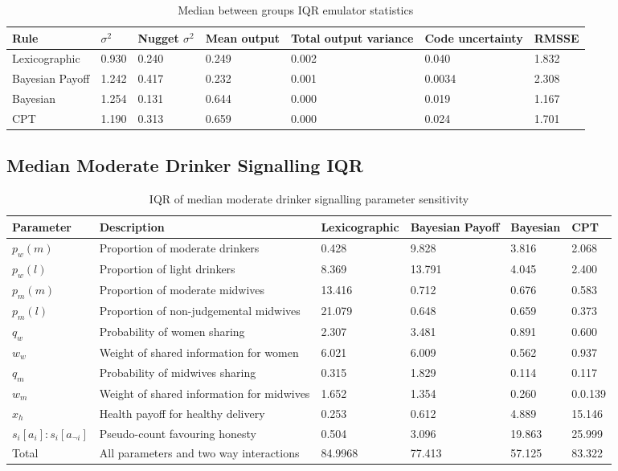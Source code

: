 \begin{table}[H]
\caption{Median between groups IQR emulator statistics \label{tab:sa_emulator_iqr}}
\begin{tabular} {jjjjjjj}
\hline
Rule & \(\sigma^2\) & Nugget \(\sigma^2\) & Mean output & Total output variance & Code uncertainty & RMSSE \\ \hline
Lexicographic & 0.930 & 0.240 & 0.249 & 0.002 & 0.040 & 1.832 \\ \hline
Bayesian Payoff & 1.242 & 0.417 & 0.232 & 0.001 & 0.0034 & 2.308 \\ \hline
Bayesian & 1.254 & 0.131 & 0.644 & 0.000 & 0.019 & 1.167 \\ \hline
\ac{CPT} & 1.190 & 0.313 & 0.659 & 0.000 & 0.024 & 1.701 \\ \hline
\end{tabular}
\end{table}



\subsection{Median Moderate Drinker Signalling IQR}

\begin{table}[H]
\caption{IQR of median moderate drinker signalling parameter sensitivity \label{tab:sa_results_sig_iqr}}
\begin{tabular} {jjjjjj}
\hline
Parameter & Description & Lexicographic & Bayesian Payoff & Bayesian & \ac{CPT} \\ \hline
\(p_{w}(m)\) & Proportion of moderate drinkers & 0.428 & 9.828 & 3.816 & 2.068 \\ \hline
\(p_{w}(l)\) & Proportion of light drinkers & 8.369 & 13.791 & 4.045 & 2.400 \\ \hline
\(p_{m}(m)\) & Proportion of moderate midwives & 13.416 & 0.712 & 0.676 & 0.583 \\ \hline
\(p_{m}(l)\) & Proportion of non-judgemental midwives & 21.079 & 0.648 & 0.659 & 0.373 \\ \hline
\(q_{w}\) & Probability of women sharing & 2.307 & 3.481 & 0.891 & 0.600 \\ \hline
\(w_{w}\) & Weight of shared information for women & 6.021 & 6.009 & 0.562 & 0.937 \\ \hline
\(q_{m}\) & Probability of midwives sharing & 0.315 & 1.829 & 0.114 & 0.117 \\ \hline
\(w_{m}\) & Weight of shared information for midwives & 1.652 & 1.354 & 0.260 & 0.0.139 \\ \hline
\(x_{h}\) & Health payoff for healthy delivery & 0.253 & 0.612 & 4.889 & 15.146 \\ \hline
\(s_{i}[a_{i}]:s_{i}[a_{\neg i}]\) & Pseudo-count favouring honesty & 0.504 & 3.096 & 19.863 & 25.999 \\ \hline
Total & All parameters and two way interactions & 84.9968 & 77.413 & 57.125 & 83.322 \\ \hline
\end{tabular}
\end{table}

